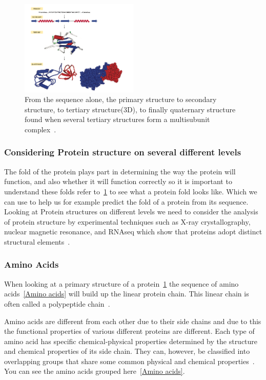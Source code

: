 \documentclass{report}
\begin{document}
\begin{figure}[H]
    \centering
    \includegraphics[width=0.5\textwidth]{Protein Structure.png}
    \caption{\label{fig:levels of protein structure.}From the sequence alone, the primary structure to secondary structure, to tertiary structure(3D), to finally quaternary structure found when several tertiary structures form a multisubunit complex~\cite{zvelebil_understanding_2008}.}
\end{figure}


\subsubsection{Considering Protein structure on several different levels}

The fold of the protein plays part in determining the way the protein will function, and also whether it will function correctly so it is important to understand these folds refer to~\ref{fig:levels of protein structure.} to see what a protein fold looks like. Which we can use to help us for example predict the fold of a protein from its sequence. Looking at Protein structures on different levels we need to consider the analysis of protein structure by experimental techniques such as X-ray crystallography, nuclear magnetic resonance, and RNAseq which show that proteins adopt distinct structural elements~\cite{zvelebil_understanding_2008}.

\subsubsection{Amino Acids}

When looking at a primary structure of a protein~\ref{fig:levels of protein structure.} the sequence of amino acids~\ref{Amino acids} will build up the linear protein chain. This linear chain is often called a polypeptide chain~\cite{zvelebil_understanding_2008}.

Amino acids are different from each other due to their side chains and due to this the functional properties of various different proteins are different. Each type of amino acid has specific chemical-physical properties determined by the structure and chemical properties of its side chain. They can, however, be classified into overlapping groups that share some common physical and chemical properties~\cite{zvelebil_understanding_2008}. You can see the amino acids grouped here~\ref{Amino acids}.
\end{document}

